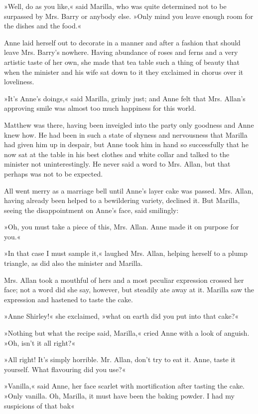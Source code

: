 »Well, do as you like,« said Marilla, who was quite determined not to be surpassed by Mrs. Barry or anybody else. »Only mind you leave enough room for the dishes and the food.«

Anne laid herself out to decorate in a manner and after a fashion that should leave Mrs. Barry’s nowhere. Having abundance of roses and ferns and a very artistic taste of her own, she made that tea table such a thing of beauty that when the minister and his wife sat down to it they exclaimed in chorus over it loveliness.

»It’s Anne’s doings,« said Marilla, grimly just; and Anne felt that Mrs. Allan’s approving smile was almost too much happiness for this world.

Matthew was there, having been inveigled into the party only goodness and Anne knew how. He had been in such a state of shyness and nervousness that Marilla had given him up in despair, but Anne took him in hand so successfully that he now sat at the table in his best clothes and white collar and talked to the minister not uninterestingly. He never said a word to Mrs. Allan, but that perhaps was not to be expected.

All went merry as a marriage bell until Anne’s layer cake was passed. Mrs. Allan, having already been helped to a bewildering variety, declined it. But Marilla, seeing the disappointment on Anne’s face, said smilingly:

»Oh, you must take a piece of this, Mrs. Allan. Anne made it on purpose for you.«

»In that case I must sample it,« laughed Mrs. Allan, helping herself to a plump triangle, as did also the minister and Marilla.

Mrs. Allan took a mouthful of hers and a most peculiar expression crossed her face; not a word did she say, however, but steadily ate away at it. Marilla saw the expression and hastened to taste the cake.

»Anne Shirley!« she exclaimed, »what on earth did you put into that cake?«

»Nothing but what the recipe said, Marilla,« cried Anne with a look of anguish. »Oh, isn’t it all right?«

»All right! It’s simply horrible. Mr. Allan, don’t try to eat it. Anne, taste it yourself. What flavouring did you use?«

»Vanilla,« said Anne, her face scarlet with mortification after tasting the cake. »Only vanilla. Oh, Marilla, it must have been the baking powder. I had my suspicions of that bak\longdash«

